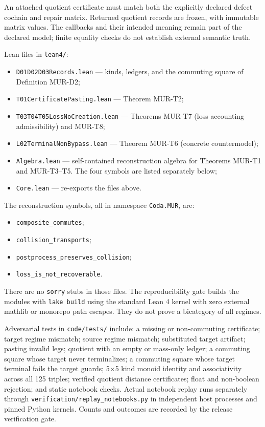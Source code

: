 \documentclass[
  11pt,
]{article}
\providecommand{\tightlist}{%
  \setlength{\itemsep}{0pt}\setlength{\parskip}{0pt}}
\begin{document}
An attached quotient certificate must match both the explicitly declared defect cochain and repair matrix. Returned quotient records are frozen, with immutable matrix values. The callbacks and their intended meaning remain part of the declared model; finite equality checks do not establish external semantic truth.

Lean files in \texttt{lean4/}:

\begin{itemize}
\tightlist
\item
  \nolinkurl{D01D02D03Records.lean} --- kinds, ledgers, and the commuting square of Definition MUR-D2;
\item
  \nolinkurl{T01CertificatePasting.lean} --- Theorem MUR-T2;
\item
  \nolinkurl{T03T04T05LossNoCreation.lean} --- Theorems MUR-T7 (loss accounting admissibility) and MUR-T8;
\item
  \nolinkurl{L02TerminalNonBypass.lean} --- Theorem MUR-T6 (concrete countermodel);
\item
  \nolinkurl{Algebra.lean} --- self-contained reconstruction algebra for Theorems MUR-T1 and MUR-T3--T5. The four symbols are listed separately below;
\item
  \nolinkurl{Core.lean} --- re-exports the files above.
\end{itemize}

The reconstruction symbols, all in namespace \texttt{Coda.MUR}, are:

\begin{itemize}
\tightlist
\item
  \texttt{composite\_commutes};
\item
  \nolinkurl{collision_transports};
\item
  \nolinkurl{postprocess_preserves_collision};
\item
  \nolinkurl{loss_is_not_recoverable}.
\end{itemize}

There are no \texttt{sorry} stubs in those files. The reproducibility gate builds the modules with \texttt{lake\ build} using the standard Lean 4 kernel with zero external mathlib or monorepo path escapes. They do not prove a bicategory of all regimes.

Adversarial tests in \texttt{code/tests/} include: a missing or non-commuting certificate; target regime mismatch; source regime mismatch; substituted target artifact; pasting invalid legs; quotient with an empty or mass-only ledger; a commuting square whose target never terminalizes; a commuting square whose target terminal fails the target guards; 5×5 kind monoid identity and associativity across all 125 triples; verified quotient distance certificates; float and non-boolean rejection; and static notebook checks. Actual notebook replay runs separately through \nolinkurl{verification/replay_notebooks.py} in independent host processes and pinned Python kernels. Counts and outcomes are recorded by the release verification gate.
\end{document}
